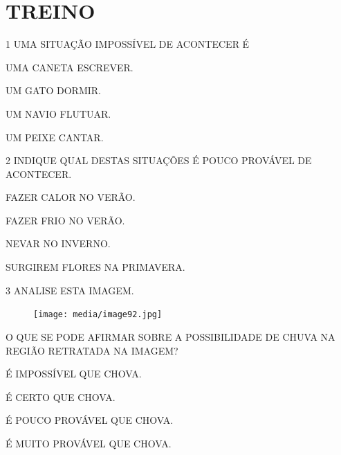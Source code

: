 \begin{mdframed}[linewidth=2pt,linecolor=salmao,roundcorner=10pt]
\vspace{18cm}
\end{mdframed}

\section{TREINO}

\num{1} UMA SITUAÇÃO IMPOSSÍVEL DE ACONTECER É

\begin{escolha}
\item UMA CANETA ESCREVER.

\item UM GATO DORMIR.

\item UM NAVIO FLUTUAR.

\item UM PEIXE CANTAR.
\end{escolha}

\num{2} INDIQUE QUAL DESTAS SITUAÇÕES É POUCO PROVÁVEL DE ACONTECER.

\begin{escolha}
\item FAZER CALOR NO VERÃO.

\item FAZER FRIO NO VERÃO.

\item NEVAR NO INVERNO.

\item SURGIREM FLORES NA PRIMAVERA.
\end{escolha}

\pagebreak
\num{3} ANALISE ESTA IMAGEM.

\begin{figure}[htpb!]
\centering
\texttt{[image: media/image92.jpg]}
\end{figure}

O QUE SE PODE AFIRMAR SOBRE A POSSIBILIDADE DE CHUVA NA REGIÃO RETRATADA NA IMAGEM?

\begin{escolha}
\item É IMPOSSÍVEL QUE CHOVA.

\item É CERTO QUE CHOVA.

\item É POUCO PROVÁVEL QUE CHOVA.

\item É MUITO PROVÁVEL QUE CHOVA.
\end{escolha}

